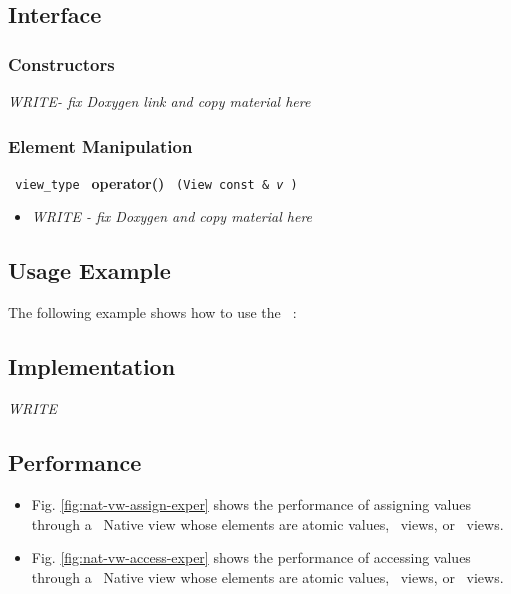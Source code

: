 \subsection{Interface} \label{sec-nat-vw-inter}

\subsubsection{Constructors}

\textit{WRITE-  fix Doxygen link and copy material here}

\subsubsection{ Element Manipulation}

\noindent
\texttt{%
view\_type
}
\newline
\textbf{operator()}%
\texttt{%
(View const \&
\textit{v}%
)
}

\begin{itemize}
\item
\textit{WRITE -  fix Doxygen and copy material here}
\end{itemize}

\subsection{Usage Example} \label{sec-nat-vw-use}

The following example shows how to use the \texttt{ }:


\subsection{Implementation} \label{sec-nat-vw-impl}

\textit{WRITE}

\subsection{Performance} \label{sec-nat-vw-perf}

\begin{itemize}
\item
Fig. \ref{fig:nat-vw-assign-exper}
shows the performance of assigning values through a \stapl\ Native view
whose elements are atomic values, \stl\ views, or \stapl\ views.
\item
Fig. \ref{fig:nat-vw-access-exper}
shows the performance of accessing values through a \stapl\ Native view
whose elements are atomic values, \stl\ views, or \stapl\ views.
\end{itemize}


